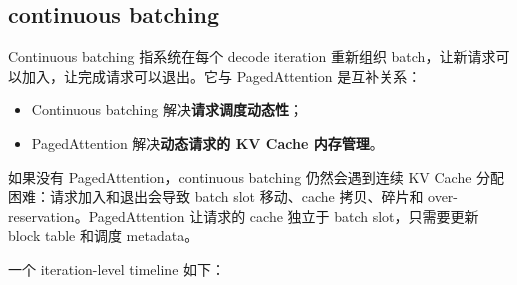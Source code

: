 \subsection{continuous batching}
\label{subsec:vllm-continuous-batching}

Continuous batching 指系统在每个 decode iteration 重新组织 batch，让新请求可以加入，让完成请求可以退出。它与 PagedAttention 是互补关系：

\begin{itemize}
\item Continuous batching 解决\textbf{请求调度动态性}；
\item PagedAttention 解决\textbf{动态请求的 KV Cache 内存管理}。
\end{itemize}

如果没有 PagedAttention，continuous batching 仍然会遇到连续 KV Cache 分配困难：请求加入和退出会导致 batch slot 移动、cache 拷贝、碎片和 over-reservation。PagedAttention 让请求的 cache 独立于 batch slot，只需要更新 block table 和调度 metadata。

一个 iteration-level timeline 如下：

